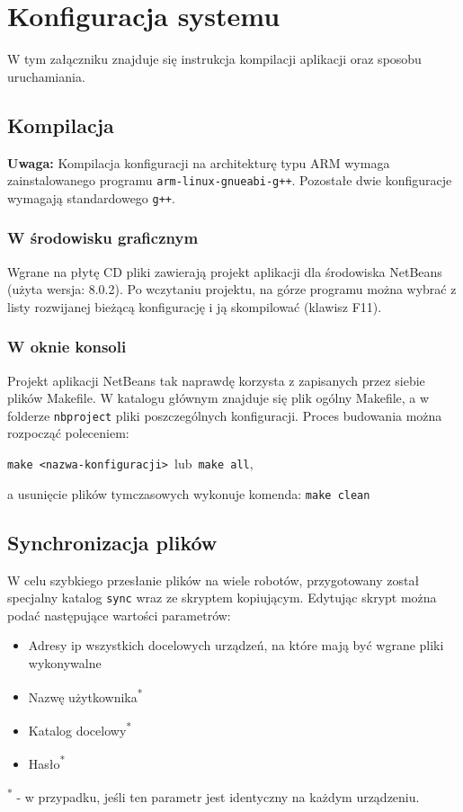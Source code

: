 \section{Konfiguracja systemu}
\label{ch:konfiguracja_systemu}

W tym załączniku znajduje się instrukcja kompilacji aplikacji oraz sposobu uruchamiania.

\subsection{Kompilacja}

\textbf{Uwaga:} Kompilacja konfiguracji na architekturę typu ARM wymaga zainstalowanego programu {\tt arm-linux-gnueabi-g++}. Pozostałe dwie konfiguracje wymagają standardowego {\tt g++}.

\subsubsection{W środowisku graficznym}

Wgrane na płytę CD pliki zawierają projekt aplikacji dla środowiska NetBeans (użyta wersja: 8.0.2). Po wczytaniu projektu, na górze programu można wybrać z listy rozwijanej bieżącą konfigurację i ją skompilować (klawisz F11).

\subsubsection{W oknie konsoli}

Projekt aplikacji NetBeans tak naprawdę korzysta z zapisanych przez siebie plików Makefile. W katalogu głównym znajduje się plik ogólny Makefile, a w folderze {\tt nbproject} pliki poszczególnych konfiguracji. Proces budowania można rozpocząć poleceniem:
\begin{center}
    {\tt make <nazwa-konfiguracji>}\  lub\
    {\tt make all},
\end{center}
a usunięcie plików tymczasowych wykonuje komenda: {\tt make clean}

\subsection{Synchronizacja plików}

W celu szybkiego przesłanie plików na wiele robotów, przygotowany został specjalny katalog {\tt sync} wraz ze skryptem kopiującym. Edytując skrypt można podać następujące wartości parametrów:
\begin{itemize}
    \item Adresy ip wszystkich docelowych urządzeń, na które mają być wgrane pliki wykonywalne
    \item Nazwę użytkownika\textsuperscript{*}
    \item Katalog docelowy\textsuperscript{*}
    \item Hasło\textsuperscript{*}
\end{itemize}
\textsuperscript{*} - w przypadku, jeśli ten parametr jest identyczny na każdym urządzeniu.

